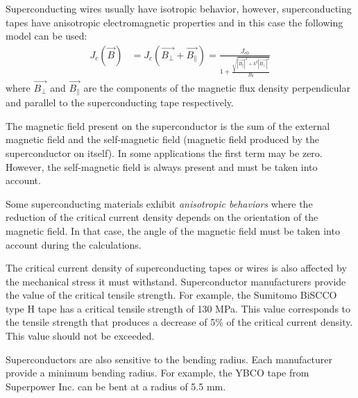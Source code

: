 \documentclass{ws-jmrr}
\begin{document}
\begin{multicols}{2}
Superconducting wires usually have isotropic behavior, however, superconducting tapes have anisotropic electromagnetic properties and in this case the following model can be used:
\begin{align}
J_c(\vec{B})&=J_c(\vec{B_{\perp}}+\vec{B_{\parallel}})=\frac{J_{\textrm{c0}}}{1+\frac{\sqrt{|\vec{B_{\parallel}}|^2+k^2|\vec{B_{\perp}}|^2}}{B_0}}
\label{model2}
\end{align}
where $\vec{B_{\perp}}$ and $\vec{B_{\parallel}}$ are the components of the magnetic flux density perpendicular and parallel to the superconducting tape respectively.\par
The magnetic field present on the superconductor is the sum of the external magnetic field and the self-magnetic field (magnetic field produced by the superconductor on itself). In some applications the first term may be zero. However, the self-magnetic field is always present and must be taken into account. \par
Some superconducting materials exhibit \emph{anisotropic behaviors} where the reduction of the critical current density depends on the orientation of the magnetic field. In that case, the angle of the magnetic field must be taken into account during the calculations.\par
The critical current density of superconducting tapes or wires is also affected by the mechanical stress it must withstand. Superconductor manufacturers provide the value of the critical tensile strength. For example, the Sumitomo BiSCCO type H tape has a critical tensile strength of 130 MPa. This value corresponds to the tensile strength that produces a decrease of 5\% of the critical current density. This value should not be exceeded.\par
Superconductors are also sensitive to the bending radius. Each manufacturer provide a minimum bending radius. For example, the YBCO tape from Superpower Inc. can be bent at a radius of 5.5 mm.



\end{multicols}
\end{document}
